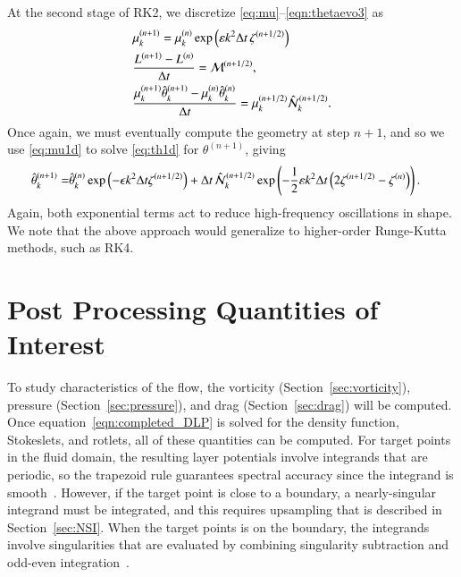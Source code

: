 \documentclass[preprint, 10pt]{elsarticle}
\begin{document}
At the second stage of RK2, we discretize \eqref{eq:mu}--\eqref{eqn:thetaevo3} as 
\begin{align}
\label{eq:mu1d}
& \mu_k^{(n+1)} = \mu_k^{(n)} \exp \left( \varepsilon k^2 {\Delta t} \, \zeta^{(n+1/2)} \right) \\
\label{eq:L1d}
& \frac{L^{(n+1)} - L^{(n)}}{\Delta t} = \mathcal{M}^{(n+1/2)}, \\
\label{eq:th1d}
& \frac{ \mu_k^{(n+1)} \hat{\theta}_k^{(n+1)} - \mu_k^{(n)} \hat{\theta}_k^{(n)}}{\Delta t} =
\mu_k^{(n+1/2)} \hat{\mathcal{N}}_k^{(n+1/2)}.
\end{align}
Once again, we must eventually compute the geometry at step $n+1$, and so we use \eqref{eq:mu1d} to solve \eqref{eq:th1d} for $\theta^{(n+1)}$, giving
\begin{align}
\hat{\theta}_k^{(n+1)} = & \hat{\theta}_k^{(n)} \exp \left( - \epsilon k^2 \Delta t \zeta^{(n+1/2)} \right) + \Delta t \, \hat{\mathcal{N}}_k^{(n+1/2)} \exp \left( - \frac{1}{2} \varepsilon k^2 \Delta t \left( 2 \zeta^{(n+1/2)} - \zeta^{(n)} \right) \right).
\end{align}
Again, both exponential terms act to reduce high-frequency oscillations in shape. We note that the above approach would generalize to higher-order Runge-Kutta methods, such as RK4.


\section{Post Processing Quantities of Interest}
\label{s:qoi}
To study characteristics of the flow, the vorticity
(Section~\ref{sec:vorticity}), pressure (Section~\ref{sec:pressure}),
and drag (Section~\ref{sec:drag}) will be computed.  Once
equation~\eqref{eqn:completed_DLP} is solved for the density function,
Stokeslets, and rotlets, all of these quantities can be computed.  For
target points in the fluid domain, the resulting layer potentials
involve integrands that are periodic, so the trapezoid rule guarantees
spectral accuracy since the integrand is smooth~\cite{tre-wei2014}.
However, if the target point is close to a boundary, a nearly-singular
integrand must be integrated, and this requires upsampling that is
described in Section~\ref{sec:NSI}.  When the target points is on the
boundary, the integrands involve singularities that are evaluated by
combining singularity subtraction and odd-even
integration~\cite{sid-isr1988}.  



\end{document}
